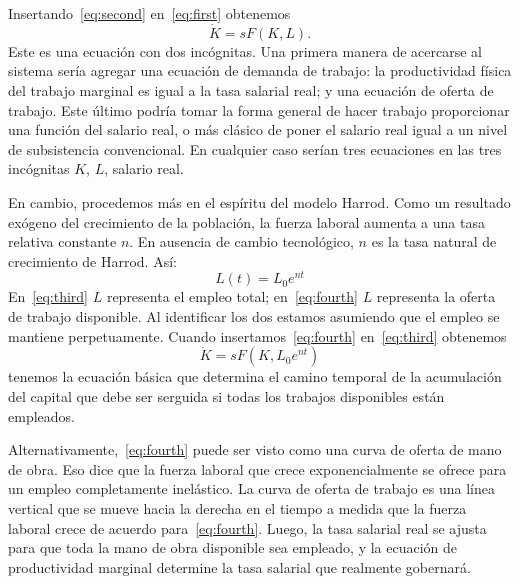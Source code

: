 Insertando~\eqref{eq:second} en~\eqref{eq:first} obtenemos
\begin{equation}\label{eq:third}
\dot{K}=sF\left(K,L\right).
\end{equation}
Este es una ecuación con dos incógnitas. Una primera manera de acercarse al sistema sería agregar una ecuación de demanda de trabajo: la productividad física del trabajo marginal es igual a la tasa salarial real; y una ecuación de oferta de trabajo. Este último podría tomar la forma general de hacer trabajo proporcionar una función del salario real, o más clásico de poner el salario real igual a un nivel de subsistencia convencional. En cualquier caso serían tres ecuaciones en las tres incógnitas $K$, $L$, salario real.

En cambio, procedemos más en el espíritu del modelo Harrod. Como un resultado exógeno del crecimiento de la población, la fuerza laboral aumenta a una tasa relativa constante $n$. En ausencia de cambio tecnológico, $n$ es la tasa natural de crecimiento de Harrod. Así:
\begin{equation}\label{eq:fourth}
L\left(t\right)=L_{0}e^{nt}
\end{equation}
En~\eqref{eq:third} $L$ representa el empleo total; en~\eqref{eq:fourth} $L$ representa la oferta de trabajo disponible. Al identificar los dos estamos asumiendo que el empleo se mantiene perpetuamente. Cuando insertamos~\eqref{eq:fourth} en~\eqref{eq:third} obtenemos
\begin{equation}\label{eq:fifth}
\dot{K}=sF\left(K,L_{0}e^{nt}\right)
\end{equation}
tenemos la ecuación básica que determina el camino temporal de la acumulación del capital que debe ser serguida si todas los trabajos disponibles están empleados.

Alternativamente,~\eqref{eq:fourth} puede ser visto como una curva de oferta de mano de obra. Eso dice que la fuerza laboral que crece exponencialmente se ofrece para un empleo completamente inelástico. La curva de oferta de trabajo es una línea vertical que se mueve hacia la derecha en el tiempo a medida que la fuerza laboral crece de acuerdo
para~\eqref{eq:fourth}. Luego, la tasa salarial real se ajusta para que toda la mano de obra disponible sea empleado, y la ecuación de productividad marginal determine la tasa salarial que realmente gobernará.

